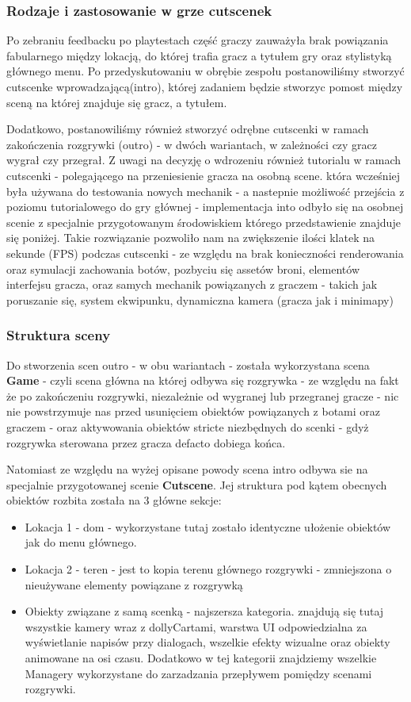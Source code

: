 \subsubsection{Rodzaje i zastosowanie  w grze cutscenek}
Po zebraniu feedbacku po playtestach część graczy zauważyła brak powiązania fabularnego między lokacją, do której trafia gracz a tytułem gry oraz stylistyką głównego menu.
Po przedyskutowaniu w obrębie zespołu postanowiliśmy stworzyć cutscenke wprowadzającą(intro), której zadaniem będzie stworzyc pomost między sceną na której znajduje się gracz, a tytułem.

Dodatkowo, postanowiliśmy również stworzyć odrębne cutscenki w ramach zakończenia rozgrywki (outro) - w dwóch wariantach,
w zależności czy gracz wygrał czy przegrał.
Z uwagi na decyzję o wdrozeniu również tutorialu w ramach cutscenki - polegającego na przeniesienie gracza na osobną scene. która wcześniej była używana do testowania nowych mechanik - a nastepnie możliwość przejścia z poziomu tutorialowego do gry głównej - implementacja into odbyło się na osobnej scenie z specjalnie przygotowanym środowiskiem którego przedstawienie znajduje się poniżej.
Takie rozwiązanie pozwoliło nam na zwiększenie ilości klatek na sekunde (FPS) podczas cutscenki - ze względu na brak konieczności renderowania oraz symulacji zachowania botów, pozbyciu się assetów broni, elementów interfejsu gracza, oraz samych mechanik powiązanych z graczem - takich jak poruszanie się, system ekwipunku, dynamiczna kamera (gracza jak i minimapy)

\subsubsection{Struktura sceny}
Do stworzenia scen outro - w obu wariantach - została wykorzystana scena \textbf{Game} - czyli scena główna na której odbywa się rozgrywka - ze względu na fakt że po zakończeniu rozgrywki, niezależnie od wygranej lub przegranej gracze - nic nie powstrzymuje nas przed usunięciem obiektów powiązanych z botami oraz graczem - oraz aktywowania obiektów stricte niezbędnych do scenki - gdyż rozgrywka sterowana przez gracza defacto dobiega końca.

Natomiast ze względu na wyżej opisane powody scena intro odbywa sie na specjalnie przygotowanej scenie \textbf{Cutscene}.
Jej struktura pod kątem obecnych obiektów rozbita została na 3 główne sekcje:
\begin{itemize}
    \item Lokacja 1 - dom - wykorzystane tutaj zostało identyczne ułożenie obiektów jak do menu głównego.
    \item Lokacja 2 - teren - jest to kopia terenu głównego rozgrywki - zmniejszona o nieużywane elementy powiązane z rozgrywką
    \item Obiekty związane z samą scenką - najszersza kategoria. znajdują się tutaj wszystkie kamery wraz z dollyCartami,
    warstwa UI odpowiedzialna za wyświetlanie napisów przy dialogach, wszelkie efekty wizualne oraz obiekty animowane na osi czasu.
    Dodatkowo w tej kategorii znajdziemy wszelkie Managery wykorzystane do zarzadzania przepływem pomiędzy scenami rozgrywki.
\end{itemize}

